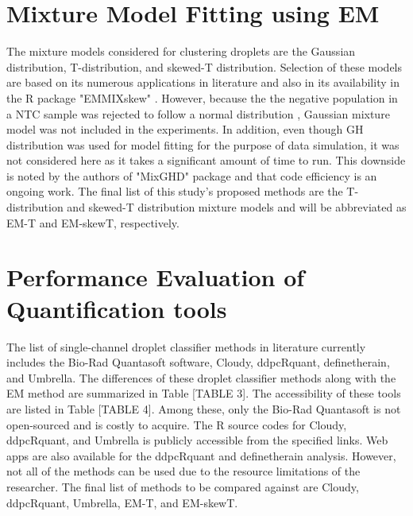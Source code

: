 \section{Mixture Model Fitting using EM}
\label{sec:modelfitting}

The mixture models considered for clustering droplets are the Gaussian distribution, T-distribution, and skewed-T distribution. Selection of these models are based on its numerous applications in literature and also in its availability in the R package "EMMIXskew" \cite{ref:EMMIXSkew}. However, because the the negative population in a NTC sample was rejected to follow a normal distribution \cite{ref:Trypsteen2015, ref:Jacobs2017}, Gaussian mixture model was not included in the experiments. In addition, even though GH distribution was used for model fitting for the purpose of data simulation, it was not considered here as it takes a significant amount of time to run. This downside is noted by the authors of "MixGHD" package and that code efficiency is an ongoing work. The final list of this study's proposed methods are the T-distribution and skewed-T distribution mixture models and will be abbreviated as EM-T and EM-skewT, respectively.

\section{Performance Evaluation of Quantification tools}
\label{sec:performanceeval}

The list of single-channel droplet classifier methods in literature currently includes the Bio-Rad Quantasoft software, Cloudy, ddpcRquant, definetherain, and Umbrella. The differences of these droplet classifier methods along with the EM method are summarized in Table [TABLE 3]. The accessibility of these tools are listed in Table [TABLE 4]. Among these, only the Bio-Rad Quantasoft is not open-sourced and is costly to acquire. The R source codes for Cloudy, ddpcRquant, and Umbrella is publicly accessible from the specified links. Web apps are also available for the ddpcRquant and definetherain analysis. However, not all of the methods can be used due to the resource limitations of the researcher. The final list of methods to be compared against are Cloudy, ddpcRquant, Umbrella, EM-T, and EM-skewT. 

